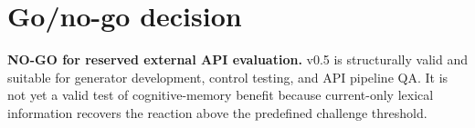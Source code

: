 \documentclass[10.5pt]{article}
\begin{document}
\section{Go/no-go decision}
\noindent\colorbox{warn}{\parbox{.96\linewidth}{\textbf{NO-GO for reserved external API evaluation.} v0.5 is structurally valid and suitable for generator development, control testing, and API pipeline QA. It is not yet a valid test of cognitive-memory benefit because current-only lexical information recovers the reaction above the predefined challenge threshold.}}
\end{document}
